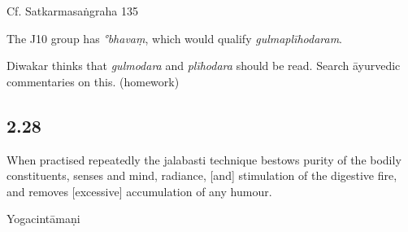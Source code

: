 \begin{ekdosis}
\begin{testimonia}[hp02_027]
\begin{versinnote}
\end{versinnote}

Cf. Satkarmasaṅgraha 135

\begin{versinnote}
\end{versinnote}
\end{testimonia}

\begin{philcomm}[hp02_027]
The J10 group has \emph{°bhavaṃ}, which would qualify \emph{gulmaplīhodaram}.

Diwakar thinks that \emph{gulmodara} and \emph{plīhodara} should be read. Search āyurvedic commentaries on this. (homework)
\end{philcomm}

\subsection*{2.28}
\begin{translation}[hp02_028]
When practised repeatedly the jalabasti technique bestows purity of the bodily constituents, senses and mind, radiance, [and] stimulation of the digestive fire, and removes [excessive] accumulation of any humour.
\end{translation}

\begin{sources}[hp02_028]
\end{sources}

\begin{testimonia}[hp02_028]
Yogacintāmaṇi

\begin{versinnote}
\end{versinnote}


\end{testimonia}
\end{ekdosis}
